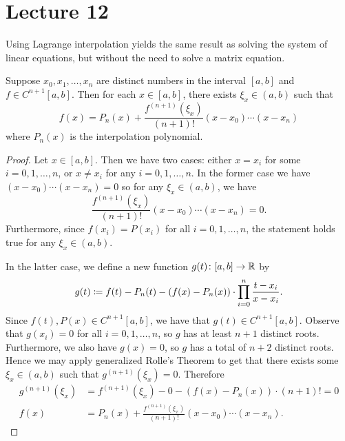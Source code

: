 \documentclass[class=article, crop=false]{standalone}
\begin{document}
  \section{Lecture 12}
  \begin{note}{}
    Using Lagrange interpolation yields the same result as solving the system of linear equations, but without the need to solve a matrix equation.
  \end{note}
  \begin{theorem}{}
    Suppose $x_0,x_1,\dotsc,x_n$ are distinct numbers in the interval $[a, b]$ and $f\in C^{n + 1}[a, b]$. Then for each $x\in [a, b]$, there exists $\xi_x\in (a, b)$ such that
    \[
      f(x) = P_n(x) + \frac{f^{(n + 1)}(\xi_x)}{(n + 1)!}(x - x_0)\dotsb(x - x_n)
    \]
    where $P_n(x)$ is the interpolation polynomial.
    \begin{proof}
      Let $x\in [a, b]$. Then we have two cases: either $x = x_i$ for some $i = 0,1,\dotsc,n$, or $x\neq x_i$ for any $i = 0,1,\dotsc,n$. In the former case we have $(x - x_0)\dotsb(x - x_n) = 0$ so for any $\xi_x\in (a, b)$, we have
      \[
        \frac{f^{(n + 1)}(\xi_x)}{(n + 1)!}(x - x_0)\dotsb(x - x_n) = 0.
      \]
      Furthermore, since $f(x_i) = P(x_i)$ for all $i = 0,1,\dotsc,n$, the statement holds true for any $\xi_x\in (a, b)$. \par
      In the latter case, we define a new function $g(t)\colon [a, b]\to\mathbb{R}$ by
      \[
        g(t)\coloneqq f(t) - P_n(t) - (f(x) - P_n(x))\cdot \prod_{i = 0}^n \frac{t - x_i}{x - x_i}.
      \]
      Since $f(t), P(x)\in C^{n + 1}[a, b]$, we have that $g(t)\in C^{n + 1}[a, b]$. Observe that $g(x_i) = 0$ for all $i = 0,1,\dotsc,n$, so $g$ has at least $n + 1$ distinct roots. Furthermore, we also have $g(x) = 0$, so $g$ has a total of $n + 2$ distinct roots. Hence we may apply generalized Rolle's Theorem to get that there exists some $\xi_x\in (a, b)$ such that $g^{(n + 1)}(\xi_x) = 0$. Therefore
      \begin{align*}
        g^{(n + 1)}(\xi_x) &= f^{(n + 1)}(\xi_x) - 0 - (f(x) - P_n(x))\cdot (n + 1)! = 0 \\
        f(x) &= P_n(x) + \frac{f^{(n + 1)}(\xi_x)}{(n + 1)!}(x - x_0)\dotsb(x - x_n).
      \end{align*}
    \end{proof}
  \end{theorem}
\end{document}
